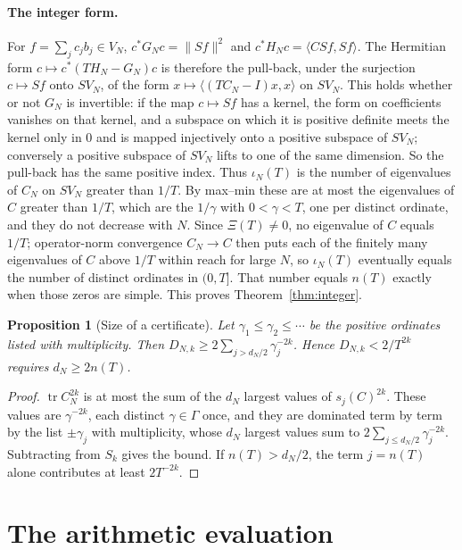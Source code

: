 \documentclass[11pt,a4paper]{article}
\theoremstyle{plain}
\newtheorem{proposition}[theorem]{Proposition}
\theoremstyle{remark}
\DeclareMathOperator{\tr}{tr}
\begin{document}
\paragraph{The integer form.}
For $f=\sum_jc_jb_j\in V_N$, $c^*G_Nc=\|Sf\|^2$ and $c^*H_Nc=\langle CSf,Sf\rangle$. The Hermitian form
$c\mapsto c^*(TH_N-G_N)c$ is therefore the pull-back, under the surjection $c\mapsto Sf$ onto $SV_N$, of the form
$x\mapsto\langle(TC_N-I)x,x\rangle$ on $SV_N$. This holds whether or not $G_N$ is invertible: if the map
$c\mapsto Sf$ has a kernel, the form on coefficients vanishes on that kernel, and a subspace on which it is positive
definite meets the kernel only in $0$ and is mapped injectively onto a positive subspace of $SV_N$; conversely a
positive subspace of $SV_N$ lifts to one of the same dimension. So the pull-back has the same positive index. Thus
$\iota_N(T)$ is the number of eigenvalues of $C_N$ on $SV_N$ greater than $1/T$. By max--min these are at most the
eigenvalues of $C$ greater than $1/T$, which are the $1/\gamma$ with $0<\gamma<T$, one per distinct ordinate, and
they do not decrease with $N$. Since $\Xi(T)\ne0$, no eigenvalue of $C$ equals $1/T$; operator-norm convergence
$C_N\to C$ then puts each of the finitely many eigenvalues of $C$ above $1/T$ within reach for large $N$, so
$\iota_N(T)$ eventually equals the number of distinct ordinates in $(0,T]$. That number equals $n(T)$ exactly when
those zeros are simple. This proves Theorem~\ref{thm:integer}.

\begin{proposition}[Size of a certificate]\label{prop:size}
Let $\gamma_1\le\gamma_2\le\cdots$ be the positive ordinates listed with multiplicity. Then
$D_{N,k}\ge2\sum_{j>d_N/2}\gamma_j^{-2k}$. Hence $D_{N,k}<2/T^{2k}$ requires $d_N\ge2n(T)$.
\end{proposition}
\begin{proof}
$\tr C_N^{2k}$ is at most the sum of the $d_N$ largest values of $s_j(C)^{2k}$. These values are $\gamma^{-2k}$, each
distinct $\gamma\in\Gamma$ once, and they are dominated term by term by the list $\pm\gamma_j$ with multiplicity, whose
$d_N$ largest values sum to $2\sum_{j\le d_N/2}\gamma_j^{-2k}$. Subtracting from $S_k$ gives the bound. If
$n(T)>d_N/2$, the term $j=n(T)$ alone contributes at least $2T^{-2k}$.
\end{proof}

\section{The arithmetic evaluation}\label{sec:arith}
\end{document}
